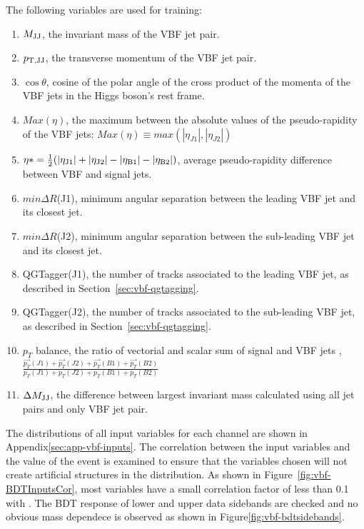 The following variables are used for training:
\begin{enumerate}
\item $M_{\rm JJ}$, the invariant mass of the VBF jet pair. 
\item $p_{\rm T,JJ}$, the transverse momentum of the VBF jet pair. 
\item $\cos{\theta}$, cosine of the polar angle of the cross product of the momenta of the VBF jets in the Higgs boson's rest frame.
\item $Max (\eta)$, the maximum between the absolute values of the pseudo-rapidity of the VBF jets: $Max (\eta) \equiv max( |\eta_{J1}|, |\eta_{J2}| )$
\item $\eta* = \frac{1}{2}( |\eta_{\rm J1}| + |\eta_{\rm J2}| - |\eta_{\rm B1}| - |\eta_{\rm B2}|)$, average pseudo-rapidity difference between VBF and signal jets.
\item $min\Delta R$(J1), minimum angular separation between the leading VBF jet and its closest jet. 
\item $min\Delta R$(J2), minimum angular separation between the sub-leading VBF jet and its closest jet. 
\item QGTagger(J1),  the number of tracks associated to the leading VBF jet, as described in Section~\ref{sec:vbf-qgtagging}.
\item QGTagger(J2),  the number of tracks associated to the sub-leading VBF jet, as described in Section~\ref{sec:vbf-qgtagging}.
\item $p_{T}$ balance, the ratio of vectorial and scalar sum of signal and VBF jets \pT,  $\frac{\overrightarrow{p_{T}}(J1)+\overrightarrow{p_{T}}(J2)+\overrightarrow{p_{T}}(B1)+\overrightarrow{p_{T}}(B2) }{ p_{T}(J1)+p_{T}(J2)+p_{T}(B1)+p_{T}(B2)}$
\item $\Delta M_{\rm JJ}$, the difference between largest invariant mass calculated using all jet pairs and only VBF jet pair. 
\end{enumerate}

The distributions of all input variables for each channel are
shown in Appendix\ref{sec:app-vbf-inputs}.
The correlation between the input variables and the \Mbb value of the event
is examined to ensure that the variables chosen will not create artificial
structures in the \Mbb distribution.
As shown in Figure~\ref{fig:vbf-BDTInputsCor}, most variables have a
small correlation factor of less than 0.1 with \Mbb. 
The BDT response of lower and upper data sidebands are checked and no obvious
mass dependece is observed as shown in Figure\ref{fig:vbf-bdtsidebands}.


